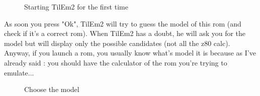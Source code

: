 \documentclass[10pt]{report}
\begin{document}
\begin{figure}[H]
\centering
{}
\caption{Starting TilEm2 for the first time}
\end{figure}

As soon you press "Ok", TilEm2 will try to guess the model of this rom (and check if it's a correct rom).\newline
When TilEm2 has a doubt, he will ask you for the model but will display only the possible candidates (not all the z80 calc).\newline
Anyway, if you launch a rom, you usually know what's model it is because as I've already said : you should have the calculator of the rom you're trying to emulate...\newline

\begin{figure}[H]
\centering
{}
\caption{Choose the model}
\end{figure}
\end{document}
